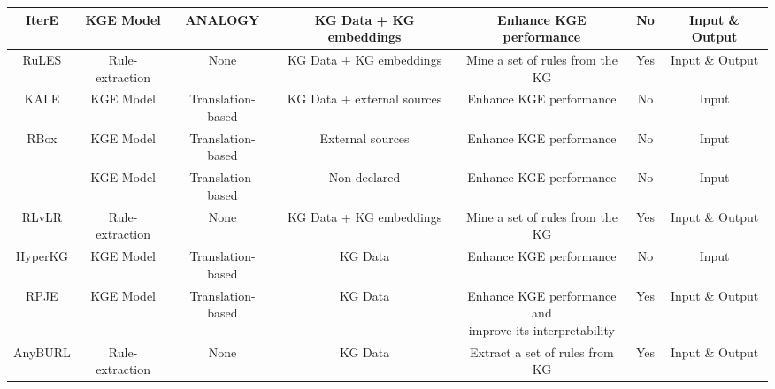 \begin{table}
{\begin{tabular}{|c|c|c|c|c|c|c|}
IterE \citep{tare}            & KGE Model       & ANALOGY                     & KG Data + KG embeddings     & Enhance KGE performance                                                               & No                             & Input \& Output                  \\ \hline
RuLES \citep{ruLES}           & Rule-extraction & None                        & KG Data + KG embeddings     & Mine a set of rules from the KG                                                       & Yes                            & Input \& Output         \\ \hline
KALE \citep{kale}             & KGE Model       & Translation-based           & KG Data + external sources  & Enhance KGE performance                                                               & No                             & Input                   \\ \hline
RBox \citep{rbox}             & KGE Model       & Translation-based           & External sources            & Enhance KGE performance                                                               & No                             & Input                   \\ \hline
\cite{yoonetal}      & KGE Model       & Translation-based           & Non-declared                & Enhance KGE performance                                                               & No                             & Input                   \\ \hline
RLvLR  \citep{rlvlr}           & Rule-extraction & None                        & KG Data + KG embeddings     & Mine a set of rules from the KG                                                       & Yes                            & Input \& Output         \\ \hline
\makecell{HyperKG\\ \citep{hyperkg}}          & KGE Model       & Translation-based           & KG Data                     & Enhance KGE performance                                                               & No                             & Input                   \\ \hline
RPJE \citep{rpje}              & KGE Model       & Translation-based           & KG Data                     & \makecell{Enhance KGE performance and \\ improve its interpretability}                              & Yes                            & Input \& Output         \\ \hline
\makecell{AnyBURL\\ \citep{anyburl}}          & Rule-extraction & None                        & KG Data                     & Extract a set of rules from KG                                                        & Yes                            & Input \& Output         \\ \hline

\end{tabular}}
\end{table}
